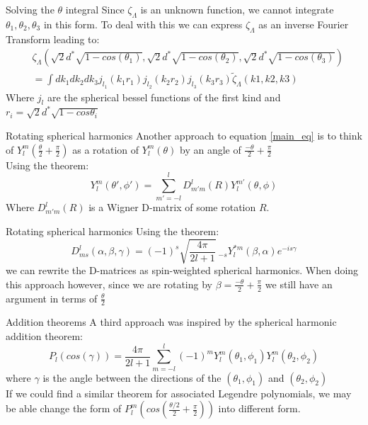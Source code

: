 \documentclass{beamer}
\begin{document}
    \begin{frame}{Solving the $\theta$ integral}
        Since $\zeta_{\Lambda}$ is an unknown function, we cannot integrate $\theta_1, \theta_2, \theta_3$ in this form.
        To deal with this we can express $\zeta_{\Lambda}$ as an inverse Fourier Transform leading to:
        \begin{align*}
            &\zeta_{\Lambda}(\sqrt{2}d^*\sqrt{1-cos(\theta_1)}, \sqrt{2}d^*\sqrt{1-cos(\theta_2)}, \sqrt{2}d^*\sqrt{1-cos(\theta_3)})\\
            &= \int dk_1 dk_2 dk_3 j_{l_1}(k_1r_1) j_{l_2}(k_2r_2) j_{l_3}(k_3r_3) \tilde \zeta_{\Lambda}(k1, k2, k3)
        \end{align*}
        Where $j_l$ are the spherical bessel functions of the first kind and $r_i = \sqrt{2}d^*\sqrt{1-cos \theta_i}$
    \end{frame}

    \begin{frame}{Rotating spherical harmonics}
        Another approach to equation \ref{main_eq} is to think of $Y_l^m(\frac{\theta}{2} + \frac{\pi}{2})$ as a rotation of $Y_l^m(\theta)$ by an angle of $\frac{-\theta}{2} + \frac{\pi}{2}$\\
        Using the theorem:
        \begin{equation*}
            Y_l^m(\theta', \phi') = \sum_{m'=-l}^l D_{m'm}^l(R) Y_l^{m'}(\theta, \phi)
        \end{equation*}
        Where $D_{m'm}^l(R)$ is a Wigner D-matrix of some rotation $R$.
    \end{frame}

    \begin{frame}{Rotating spherical harmonics}
        Using the theorem:
        \begin{equation*}
            D_{ms}^l(\alpha, \beta, \gamma) = (-1)^s \sqrt{\frac{4\pi}{2l + 1}} \ _{-s}Y_l^{*m}(\beta, \alpha)e^{-is\gamma}
        \end{equation*}
        we can rewrite the D-matrices as spin-weighted spherical harmonics. When doing this approach however, since we are rotating by $\beta = \frac{-\theta}{2} + \frac{\pi}{2}$
        we still have an argument in terms of $\frac{\theta}{2}$
    \end{frame}

    \begin{frame}{Addition theorems}
        A third approach was inspired by the spherical harmonic addition theorem:
        \begin{equation*}
            P_l(cos(\gamma)) = \frac{4\pi}{2l+1}\sum_{m=-l}^l (-1)^m Y_l^m(\theta_1, \phi_1) Y_l^m(\theta_2, \phi_2)
        \end{equation*}
        where $\gamma$ is the angle between the directions of the $(\theta_1, \phi_1)$ and $(\theta_2, \phi_2)$\\
        If we could find a similar theorem for associated Legendre polynomials, we may be able change the form of $P_l^m(cos(\frac{\theta/2}{2} + \frac{\pi}{2}))$
        into different form.
    \end{frame}
\end{document}
